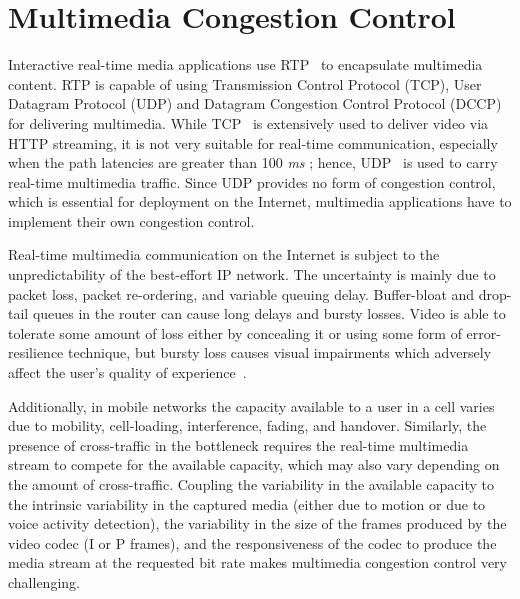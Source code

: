 


\section{Multimedia Congestion Control}

Interactive real-time media applications use RTP~\cite{rfc3550} to encapsulate
multimedia content. RTP is capable of using Transmission Control Protocol (TCP), 
User Datagram Protocol (UDP) and Datagram Congestion Control Protocol (DCCP) for delivering
multimedia.  While TCP~\cite{rfc793} is extensively used to deliver video via
HTTP streaming, it is not very suitable for real-time communication,
especially when the path latencies are greater than 100 \emph{ms} \cite{Brosh:tcp-real-time}; 
hence, UDP~\cite{rfc768} is used to carry real-time multimedia traffic. Since
UDP provides no form of congestion control, which is essential for deployment
on the Internet, multimedia applications have to implement their own congestion control.

Real-time multimedia communication on the Internet is subject to the
unpredictability of the best-effort IP network. The uncertainty is mainly due
to packet loss, packet re-ordering, and variable queuing delay.  Buffer-bloat
\cite{gettys:bufferbloat} and drop-tail queues in the router  can cause long
delays and bursty losses. Video is able to tolerate some amount of loss
either by concealing it or using some form of error-resilience technique, but
bursty loss causes visual impairments which adversely affect the user's
quality of experience~\cite{Zink03subjectiveimpression}.

Additionally, in mobile networks  the capacity available to a user in a cell
varies due to mobility, cell-loading, interference, fading, and handover.
Similarly, the presence of cross-traffic in the bottleneck requires the real-time 
multimedia stream to compete for the available capacity, which may also
vary depending on the amount of cross-traffic.  Coupling the variability in
the available capacity to  the intrinsic variability in the captured media
(either due to motion or due  to voice activity detection), the variability in the
size of the frames produced  by the video codec (I or P frames), and the
responsiveness of the codec to produce the media stream at the requested bit
rate makes multimedia congestion control very challenging.

